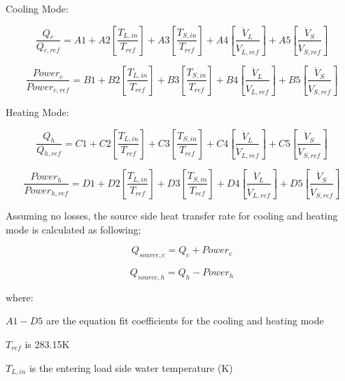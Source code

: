 Cooling Mode:

\begin{equation}
\frac{{Q{}_c}}{{Q{}_{c,ref}}} = A1 + A2\left[ {\frac{{T{}_{L,in}}}{{T{}_{ref}}}} \right] + A3\left[ {\frac{{T{}_{S,in}}}{{T{}_{ref}}}} \right] + A4\left[ {\frac{{{{\dot V}_L}}}{{{{\dot V}_{L,ref}}}}} \right] + A5\left[ {\frac{{{{\dot V}_S}}}{{{{\dot V}_{S,ref}}}}} \right]
\end{equation}

\begin{equation}
\frac{{Power{}_c}}{{Power{}_{c,ref}}} = B1 + B2\left[ {\frac{{T{}_{L,in}}}{{T{}_{ref}}}} \right] + B3\left[ {\frac{{T{}_{S,in}}}{{T{}_{ref}}}} \right] + B4\left[ {\frac{{{{\dot V}_L}}}{{{{\dot V}_{L,ref}}}}} \right] + B5\left[ {\frac{{{{\dot V}_S}}}{{{{\dot V}_{S,ref}}}}} \right]
\end{equation}

Heating Mode:

\begin{equation}
\frac{{{Q_h}}}{{Q{}_{h,ref}}} = C1 + C2\left[ {\frac{{T{}_{L,in}}}{{T{}_{ref}}}} \right] + C3\left[ {\frac{{T{}_{S,in}}}{{T{}_{ref}}}} \right] + C4\left[ {\frac{{{{\dot V}_L}}}{{{{\dot V}_{L,ref}}}}} \right] + C5\left[ {\frac{{{{\dot V}_S}}}{{{{\dot V}_{S,ref}}}}} \right]
\end{equation}

\begin{equation}
\frac{{Power{_h}}}{{Power{}_{h,ref}}} = D1 + D2\left[ {\frac{{T{}_{L,in}}}{{T{}_{ref}}}} \right] + D3\left[ {\frac{{T{}_{S,in}}}{{T{}_{ref}}}} \right] + D4\left[ {\frac{{{{\dot V}_L}}}{{{{\dot V}_{L,ref}}}}} \right] + D5\left[ {\frac{{{{\dot V}_S}}}{{{{\dot V}_{S,ref}}}}} \right]
\end{equation}

Assuming no losses, the source side heat transfer rate for cooling and heating mode is calculated as following;

\begin{equation}
{Q_{source,c}} = {Q_c} + Powe{r_c}
\end{equation}

\begin{equation}
{Q_{source,h}} = {Q_h} - Powe{r_h}
\end{equation}

where:

\(A1 - D5\) are the equation fit coefficients for the cooling and heating mode

\({T_{ref}}\) is 283.15K

\({T_{L,in}}\) is the entering load side water temperature (K)

